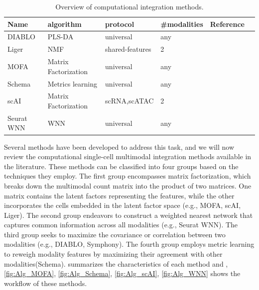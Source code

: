 \begin{table}[!ht]
	\small
	\centering
	\begin{tabular}{llllll}
		\toprule
		Name & algorithm & protocol & \#modalities  & Reference \\
		\midrule
        DIABLO &  PLS-DA & universal &  any &  \cite{singh2019diablo}\\
        Liger & NMF  &  shared-features&  2 &  \cite{kriebel2021nonnegative} \\
		MOFA     &   Matrix Factorization &  universal &  any &   \cite{argelaguet2020mofa+} \\
		Schema & Metrics learning   & universal  &  any &  \cite{singh2021schema} \\
        scAI & Matrix Factorization  &  scRNA,scATAC & 2 &  \cite{jin2020scai}\\
		Seurat WNN	 &  WNN &  universal &  any &  \cite{hao2021seurat4} \\
		\bottomrule
	\end{tabular}
	\vspace{0.1cm}
	\caption[Overview of computational integration methods]{Overview of computational integration methods.}
	\label{tab:methods_integration_overview}
\end{table}

Several methods have been developed to address this task, and we will now review the computational single-cell multimodal integration methods available in the literature. These methods can be classified into four groups based on the techniques they employ. The first group encompasses matrix factorization, which breaks down the multimodal count matrix into the product of two matrices. One matrix contains the latent factors representing the features, while the other incorporates the cells embedded in the latent factor space (e.g., MOFA, scAI, Liger). The second group endeavors to construct a weighted nearest network that captures common information across all modalities (e.g., Seurat WNN). The third group seeks to maximize the covariance or correlation between two modalities (e.g., DIABLO, Symphony). The fourth group employs metric learning to reweigh modality features by maximizing their agreement with other modalities(Schema).  summarizes the characteristics of each method and , \ref{fig:Alg_MOFA}, \ref{fig:Alg_Schema}, \ref{fig:Alg_scAI}, \ref{fig:Alg_WNN} shows the workflow of these methods.

